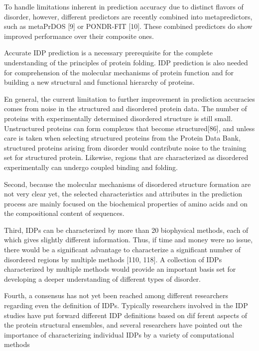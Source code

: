 To handle limitations inherent in prediction accuracy due to distinct flavors of disorder, however, different predictors are recently combined into metapredictors, such as metaPrDOS [9] or PONDR-FIT
[10]. These combined predictors do show improved performance over their composite ones.



Accurate IDP prediction is a necessary prerequisite for
the complete understanding of the principles of protein
folding. IDP prediction is also needed for comprehension
of the molecular mechanisms of protein function and
for building a new structural and functional hierarchy
of proteins.

En general, the current limitation to further improvement in prediction accuracies comes from noise in the structured and disordered protein data.
The number of proteins with experimentally determined disordered structure is still small.
Unstructured proteins can form complexes that become structured[86], and unless care is taken when selecting structured proteins from the Protein Data Bank, structured proteins arising from disorder would contribute noise to the training set for structured protein. 
Likewise, regions that are characterized as disordered experimentally can undergo coupled binding and folding.

Second, because the molecular mechanisms of disordered structure formation are not very clear yet, the selected characteristics and attributes in the prediction process are mainly focused on the biochemical properties of amino acids and on the compositional content of sequences.

Third, IDPs can be characterized by more than 20 biophysical methods, each of which gives slightly different information. Thus, if time and money were no issue,
there would be a significant advantage to characterize a significant number of disordered regions by multiple
methods [110, 118]. A collection of IDPs characterized by multiple methods would provide an important basis
set for developing a deeper understanding of different types of disorder.

Fourth, a consensus has not yet been reached among different researchers regarding even the definition of IDPs. Typically researchers involved in the IDP studies
have put forward different IDP definitions based on dif ferent aspects of the protein structural ensembles, and
several researchers have pointed out the importance of characterizing individual IDPs by a variety of computational methods







